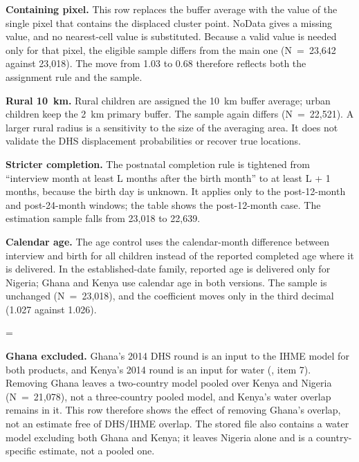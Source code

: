 \par\endgroup

\textbf{Containing pixel.} This row replaces the buffer average with the value of the single pixel that contains the displaced cluster point. NoData gives a missing value, and no nearest-cell value is substituted. Because a valid value is needed only for that pixel, the eligible sample differs from the main one (N~=~23,642 against 23,018). The move from 1.03 to 0.68 therefore reflects both the assignment rule and the sample.

\textbf{Rural 10~km.} Rural children are assigned the 10~km buffer average; urban children keep the 2~km primary buffer. The sample again differs (N~=~22,521). A larger rural radius is a sensitivity to the size of the averaging area. It does not validate the DHS displacement probabilities or recover true locations.

\textbf{Stricter completion.} The postnatal completion rule is tightened from ``interview month at least L months after the birth month'' to at least L + 1 months, because the birth day is unknown. It applies only to the post-12-month and post-24-month windows; the table shows the post-12-month case. The estimation sample falls from 23,018 to 22,639.

\textbf{Calendar age.} The age control uses the calendar-month difference between interview and birth for all children instead of the reported completed age where it is delivered. In the established-date family, reported age is delivered only for Nigeria; Ghana and Kenya use calendar age in both versions. The sample is unchanged (N~=~23,018), and the coefficient moves only in the third decimal (1.027 against 1.026).

\begingroup\edef\ThesisSavedIndent{\the\parindent}\raggedright\parindent=\ThesisSavedIndent\relax{}

\textbf{Ghana excluded.} Ghana's 2014 DHS round is an input to the IHME model for both products, and Kenya's 2014 round is an input for water (, item 7). Removing Ghana leaves a two-country model pooled over Kenya and Nigeria (N~=~21,078), not a three-country pooled model, and Kenya's water overlap remains in it. This row therefore shows the effect of removing Ghana's overlap, not an estimate free of DHS/IHME overlap. The stored file also contains a water model excluding both Ghana and Kenya; it leaves Nigeria alone and is a country-specific estimate, not a pooled one.

